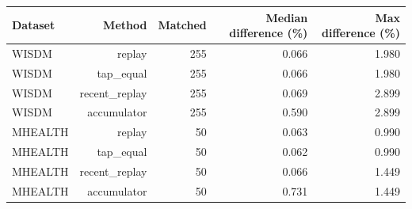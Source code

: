 \begin{tabular}{lrrrr}
\toprule
Dataset & Method & Matched & Median difference (\%) & Max difference (\%) \\
\midrule
WISDM & replay & 255 & 0.066 & 1.980 \\
WISDM & tap\_equal & 255 & 0.066 & 1.980 \\
WISDM & recent\_replay & 255 & 0.069 & 2.899 \\
WISDM & accumulator & 255 & 0.590 & 2.899 \\
MHEALTH & replay & 50 & 0.063 & 0.990 \\
MHEALTH & tap\_equal & 50 & 0.062 & 0.990 \\
MHEALTH & recent\_replay & 50 & 0.066 & 1.449 \\
MHEALTH & accumulator & 50 & 0.731 & 1.449 \\
\bottomrule
\end{tabular}
